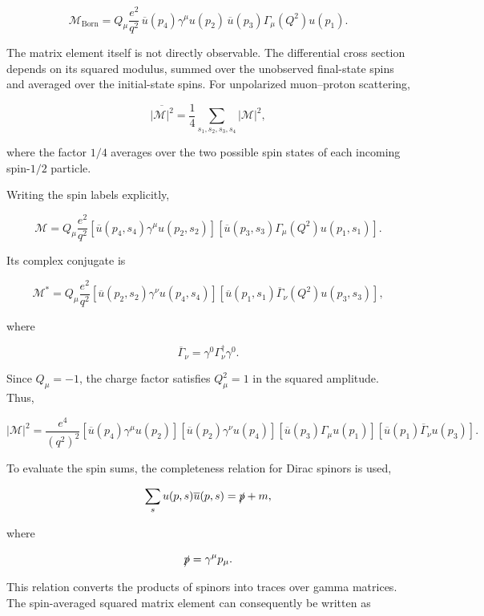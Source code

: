 \begin{equation}
\mathcal{M}_{\mathrm{Born}}
=
Q_\mu
\frac{e^2}{q^2}
\,
\overline{u}(p_4)\gamma^\mu u(p_2)
\,
\overline{u}(p_3)\Gamma_\mu(Q^2)u(p_1).
\label{eq:born_amplitude}
\end{equation}

The matrix element itself is not directly observable. The differential cross section depends on its squared modulus, summed over the unobserved final-state spins and averaged over the initial-state spins. For unpolarized muon--proton scattering,

\begin{equation}
\overline{|\mathcal{M}|^2}
=
\frac{1}{4}
\sum_{s_1,s_2,s_3,s_4}
|\mathcal{M}|^2,
\end{equation}

where the factor \(1/4\) averages over the two possible spin states of each incoming spin-\(1/2\) particle.

Writing the spin labels explicitly,

\[
\mathcal{M}
=
Q_\mu\frac{e^2}{q^2}
\left[
\overline{u}(p_4,s_4)
\gamma^\mu
u(p_2,s_2)
\right]
\left[
\overline{u}(p_3,s_3)
\Gamma_\mu(Q^2)
u(p_1,s_1)
\right].
\]

Its complex conjugate is

\[
\mathcal{M}^*
=
Q_\mu\frac{e^2}{q^2}
\left[
\overline{u}(p_2,s_2)
\gamma^\nu
u(p_4,s_4)
\right]
\left[
\overline{u}(p_1,s_1)
\overline{\Gamma}_\nu(Q^2)
u(p_3,s_3)
\right],
\]

where

\[
\overline{\Gamma}_\nu
=
\gamma^0
\Gamma_\nu^\dagger
\gamma^0.
\]

Since \(Q_\mu=-1\), the charge factor satisfies \(Q_\mu^2=1\) in the squared amplitude. Thus,

\[
|\mathcal{M}|^2
=
\frac{e^4}{(q^2)^2}
\left[
\overline{u}(p_4)\gamma^\mu u(p_2)
\right]
\left[
\overline{u}(p_2)\gamma^\nu u(p_4)
\right]
\left[
\overline{u}(p_3)\Gamma_\mu u(p_1)
\right]
\left[
\overline{u}(p_1)\overline{\Gamma}_\nu u(p_3)
\right].
\]

To evaluate the spin sums, the completeness relation for Dirac spinors is used,

\[
\sum_s
u(p,s)\overline{u}(p,s)
=
\slashed{p}+m,
\]

where

\[
\slashed{p}
=
\gamma^\mu p_\mu.
\]

This relation converts the products of spinors into traces over gamma matrices. The spin-averaged squared matrix element can consequently be written as

